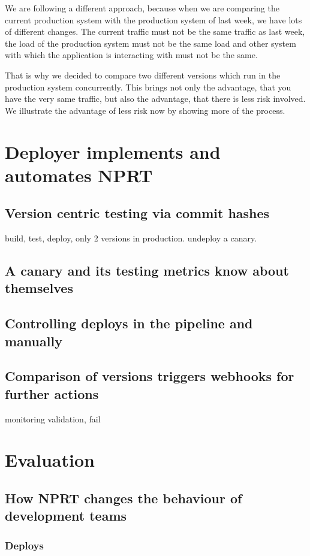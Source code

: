 We are following a different approach, because when we are comparing the current
production system with the production system of last week, we have lots of different
changes. The current traffic must not be the same traffic as last week, the load of the
production system must not be the same load and other system with which the application is
interacting with must not be the same.

That is why we decided to compare two different versions which run in the production
system concurrently. This brings not only the advantage, that you have the very same
traffic, but also the advantage, that there is less risk involved. We illustrate the
advantage of less risk now by showing more of the process.

\chapter{Deployer implements and automates NPRT}
\section{Version centric testing via commit hashes}
build, test, deploy, only 2 versions in production. undeploy a canary.
\section{A canary and its testing metrics know about themselves}
\section{Controlling deploys in the pipeline and manually}
\section{Comparison of versions triggers webhooks for further actions}
monitoring validation, fail

\chapter{Evaluation}
\section{How NPRT changes the behaviour of development teams}
\subsection{Deploys}
